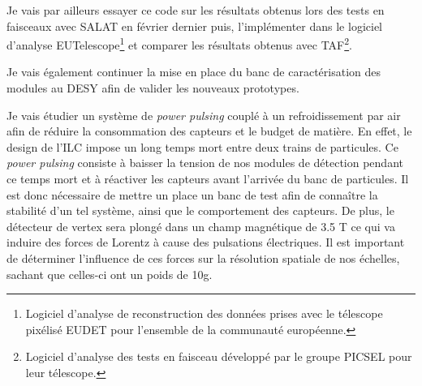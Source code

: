 \documentclass[a4papper, 10pt]{article}
\begin{document}
        Je vais par ailleurs essayer ce code sur les résultats obtenus lors des tests en faisceaux avec SALAT en février dernier puis, l'implémenter dans le logiciel d'analyse EUTelescope\footnote{Logiciel d'analyse de reconstruction des données prises avec le télescope pixélisé EUDET pour l'ensemble de la communauté européenne.} et comparer les résultats obtenus avec TAF\footnote{Logiciel d'analyse des tests en faisceau développé par le groupe PICSEL pour leur télescope.}.

        Je vais également continuer la mise en place du banc de caractérisation des modules au DESY afin de valider les nouveaux prototypes.
        
        Je vais étudier un système de \textit{power pulsing} couplé à un refroidissement par air afin de réduire la consommation des capteurs et le budget de matière. En effet, le design de l'ILC impose un long temps mort entre deux trains de particules. Ce \textit{power pulsing} consiste à baisser la tension de nos modules de détection pendant ce temps mort et à réactiver les capteurs avant l'arrivée du banc de particules.
        Il est donc nécessaire de mettre un place un banc de test afin de connaître la stabilité d'un tel système, ainsi que le comportement des capteurs.
        De plus, le détecteur de vertex sera plongé dans un champ magnétique de 3.5 T ce qui va induire des forces de Lorentz à cause des pulsations électriques. Il est important de déterminer l'influence de ces forces sur la résolution spatiale de nos échelles, sachant que celles-ci ont un poids de 10g. 

\end{document}
